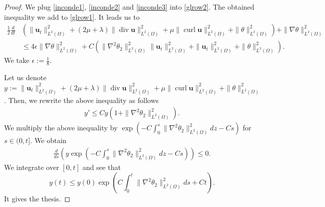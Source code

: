 \documentclass[10pt,a4paper]{amsart}
\newcommand\bb[1]{\mathbf{#1}}
\newcommand{\bu}{\bb{u}}
\DeclareMathOperator{\curl}{curl}
\newcommand{\ddt}{\frac{d}{dt}}
\renewcommand{\div}{\operatorname{div}}
\newcommand{\ld}{L^2(\Omega)}
\newcommand{\ul}{\frac{1}{2}}
\newcommand{\wspnd}{2\mu+\lambda}
\begin{document}
\begin{proof}
We plug \eqref{inconde1}, \eqref{inconde2} and \eqref{inconde3} into \eqref{glrow2}. The obtained inequality we add to \eqref{glrow1}. It leads us to
\begin{align*}
\ul\ddt&\left(\|\bu_t\|^2_{\ld}+(\wspnd)\|\div \bu\|_{\ld}^2+\mu\|\curl \bu\|_{\ld}^2+\|\theta\|^2_{\ld}\right)+\|\nabla\theta\|_{\ld}^2
\\ &\leq4\epsilon\|\nabla\theta\|_{\ld}^2+ C(\|\nabla^2\theta_2\|_{\ld}^2\|\bu_t\|_{\ld}^2+\|\bu_t\|_{\ld}^2+\|\theta\|_{\ld}^2).
\end{align*}
We take $\epsilon:=\frac18$.

Let us denote $y:=\|\bu_t\|^2_{\ld}+(\wspnd)\|\div \bu\|_{\ld}^2+\mu\|\curl \bu\|_{\ld}^2+\|\theta\|^2_{\ld}$. Then, we rewrite the above inequality as follows
\begin{align*}
y'\leq C y(1+\|\nabla^2\theta_2\|_{\ld}^2).
\end{align*}
We multiply the above inequality by $\operatorname{exp}\left(-C\int_0^s\|\nabla^2\theta_2\|_{\ld}^2dz-Cs\right)$ for $s\in(0,t]$. We obtain
\begin{align*}
\frac{d}{ds}\left(y \operatorname{exp}\left(-C\int_0^s\|\nabla^2\theta_2\|_{\ld}^2dz-Cs\right)\right)\leq 0.
\end{align*}
We integrate over $[0,t]$ and see that
$$
y(t)\leq y(0)\operatorname{exp}\left(C\int_0^t\|\nabla^2\theta_2\|_{\ld}^2ds+Ct\right).
$$
It gives the thesis.
\end{proof}
\end{document}
